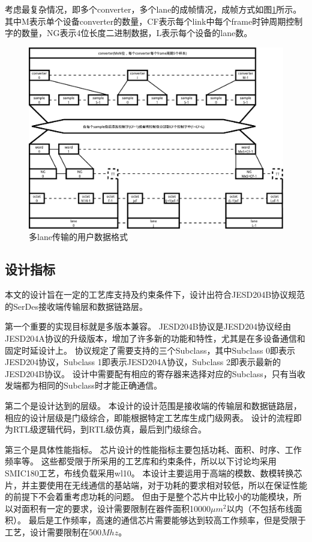 \documentclass[UTF8]{ctexart}
\begin{document}
考虑最复杂情况，即多个converter，多个lane的成帧情况，成帧方式如图\ref{fig:user_data_format_for_multiple_lanes}所示。其中M表示单个设备converter的数量，CF表示每个link中每个frame时钟周期控制字的数量，NG表示4位长度二进制数据，L表示每个设备的lane数。

\begin{figure}[H]
\centering
\includegraphics[width=17cm]{./img/user_data_format_for_multiple_lanes.pdf}
\caption{多lane传输的用户数据格式}
\label{fig:user_data_format_for_multiple_lanes}
\end{figure}

\subsection{设计指标}

本文的设计旨在一定的工艺库支持及约束条件下，设计出符合JESD204B协议规范的SerDes接收端传输层和数据链路层。

第一个重要的实现目标就是多版本兼容。
JESD204B协议是JESD204协议经由JESD204A协议的升级版本，增加了许多新的功能和特性，尤其是在多设备通信和固定时延设计上。
协议规定了需要支持的三个Subclass，其中Subclass 0即表示JESD204协议，Subclass 1即表示JESD204A协议，Subclass 2即表示最新的JESD204B协议。
设计中需要配有相应的寄存器来选择对应的Subclass，只有当收发端都为相同的Subclass时才能正确通信。

第二个是设计达到的层级。
本设计的设计范围是接收端的传输层和数据链路层，相应的设计层级是门级综合，即能根据特定工艺库生成门级网表。
设计的流程即为RTL级逻辑代码，到RTL级仿真，最后到门级综合。

第三个是具体性能指标。
芯片设计的性能指标主要包括功耗、面积、时序、工作频率等。
这些都受限于所采用的工艺库和约束条件，所以以下讨论均采用SMIC180工艺，布线负载采用wl10。
本设计主要运用于高端的模数、数模转换芯片，并主要使用在无线通信的基站端，对于功耗的要求相对较低，所以在保证性能的前提下不会着重考虑功耗的问题。
但由于是整个芯片中比较小的功能模块，所以对面积有一定的要求，设计需要限制在器件面积10000$\mu m^2$以内（不包括布线面积）。
最后是工作频率，高速的通信芯片需要能够达到较高工作频率，但是受限于工艺，设计需要限制在500$Mhz$。


\end{document}
